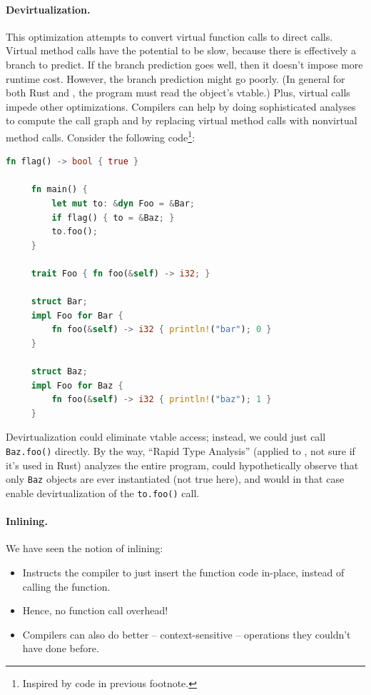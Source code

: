 \paragraph{Devirtualization.} This optimization attempts to convert
virtual function calls to direct calls. Virtual method calls have the
potential to be slow, because there is effectively a branch to
predict. If the branch prediction goes well, then it doesn't impose
more runtime cost. However, the branch prediction might go poorly. (In
general for both Rust and \CPP, the program must read the object's vtable.) Plus, virtual
calls impede other optimizations. Compilers can help by doing
sophisticated analyses to compute the call graph and by replacing
virtual method calls with nonvirtual method calls. Consider the
following code\footnote{Inspired by code in previous footnote.}:
  \begin{lstlisting}[language=Rust]
     fn flag() -> bool { true }

     fn main() {
         let mut to: &dyn Foo = &Bar;
         if flag() { to = &Baz; }
         to.foo();
     }

     trait Foo { fn foo(&self) -> i32; }

     struct Bar;
     impl Foo for Bar {
         fn foo(&self) -> i32 { println!("bar"); 0 }
     }

     struct Baz;
     impl Foo for Baz {
         fn foo(&self) -> i32 { println!("baz"); 1 }
     }
  \end{lstlisting}
Devirtualization could eliminate vtable access; instead, we could just call {\tt Baz.foo()} 
directly. By the way, ``Rapid Type Analysis'' (applied to \CPP, not sure if it's used in Rust)
analyzes the entire program, could hypothetically observe that
only {\tt Baz} objects are ever instantiated (not true here), and would in that case
enable devirtualization
of the {\tt to.foo()} call.

\paragraph{Inlining.} We have seen the notion of inlining:
  \begin{itemize}[noitemsep]
    \item Instructs the compiler to just insert the function code in-place,
      instead of calling the function.
    \item Hence, no function call overhead!
    \item Compilers can also do better -- context-sensitive -- operations they couldn't
      have done before.
  \end{itemize}

